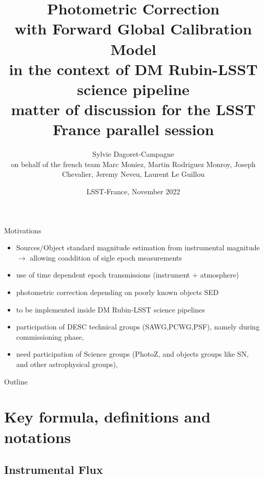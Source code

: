 \documentclass{beamer}
\title[Photometric Corrections with FGCM]{Photometric Correction \\
with Forward Global Calibration Model \\
in the context of DM Rubin-LSST science pipeline \\
{\small matter of discussion for the LSST France parallel session}}
\author[S. Dagoret-Campagne]{
Sylvie Dagoret-Campagne \\ on behalf of the french team Marc Moniez, Martin Rodriguez Monroy, Joseph Chevalier,
Jeremy Neveu, Laurent Le Guillou
}
\institute[IJCLab]{
  IJCLab,
  CNRS/IN2P3 \& Université Paris-Saclay,
  Orsay, France \\ \today  }
\date[LPNHE, November 29th 2022]{LSST-France, November 2022}
\begin{document}
\begin{frame}
  \titlepage
\end{frame}

\begin{frame}{Motivations}
\begin{itemize}
\item Sources/Object standard magnitude estimation from instrumental magnitude $\rightarrow$ allowing coaddition of sigle epoch measurements
\item use of time dependent epoch transmissions (instrument + atmosphere)
\item photometric correction depending on poorly known objects SED
\item to be implemented inside DM Rubin-LSST science pipelines 
\item participation of DESC technical groups (SAWG,PCWG,PSF), namely during commissioning phase,
\item need participation of Science groups (PhotoZ, and objects groups like SN, and other astrophysical groups),
\end{itemize}
\end{frame}

\begin{frame}{Outline}
  \tableofcontents
\end{frame}




\section{Key formula, definitions and notations}
\subsection{Instrumental Flux}
\end{document}
